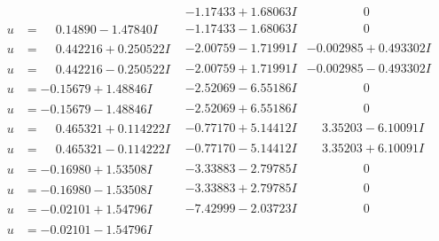 \documentclass[1p]{elsarticle_modified}
\theoremstyle{definition}
\begin{document}
$$\begin{array}{c|c|c}
 & -1.17433 + 1.68063 I & \phantom{-0.000000 } 0 \\ \hline\begin{aligned}
u &= \phantom{-}0.14890 - 1.47840 I\end{aligned}
 & -1.17433 - 1.68063 I & \phantom{-0.000000 } 0 \\ \hline\begin{aligned}
u &= \phantom{-}0.442216 + 0.250522 I\end{aligned}
 & -2.00759 - 1.71991 I & -0.002985 + 0.493302 I \\ \hline\begin{aligned}
u &= \phantom{-}0.442216 - 0.250522 I\end{aligned}
 & -2.00759 + 1.71991 I & -0.002985 - 0.493302 I \\ \hline\begin{aligned}
u &= -0.15679 + 1.48846 I\end{aligned}
 & -2.52069 - 6.55186 I & \phantom{-0.000000 } 0 \\ \hline\begin{aligned}
u &= -0.15679 - 1.48846 I\end{aligned}
 & -2.52069 + 6.55186 I & \phantom{-0.000000 } 0 \\ \hline\begin{aligned}
u &= \phantom{-}0.465321 + 0.114222 I\end{aligned}
 & -0.77170 + 5.14412 I & \phantom{-}3.35203 - 6.10091 I \\ \hline\begin{aligned}
u &= \phantom{-}0.465321 - 0.114222 I\end{aligned}
 & -0.77170 - 5.14412 I & \phantom{-}3.35203 + 6.10091 I \\ \hline\begin{aligned}
u &= -0.16980 + 1.53508 I\end{aligned}
 & -3.33883 - 2.79785 I & \phantom{-0.000000 } 0 \\ \hline\begin{aligned}
u &= -0.16980 - 1.53508 I\end{aligned}
 & -3.33883 + 2.79785 I & \phantom{-0.000000 } 0 \\ \hline\begin{aligned}
u &= -0.02101 + 1.54796 I\end{aligned}
 & -7.42999 - 2.03723 I & \phantom{-0.000000 } 0 \\ \hline\begin{aligned}
u &= -0.02101 - 1.54796 I\end{aligned}

\end{array}$$
\end{document}

